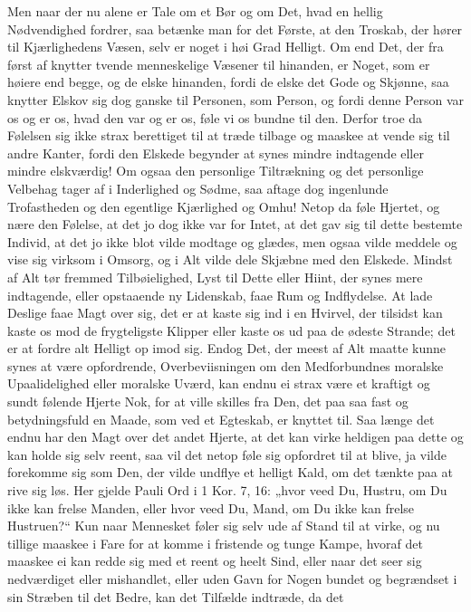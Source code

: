 \documentclass[12pt,a4paper]{book}
\newcommand{\apage}[1]{\marginnote{\footnotesize\textit{[#1]}}}
\begin{document}
Men naar der nu alene er Tale om et Bør og om Det, hvad en hellig
Nødvendighed fordrer, saa betænke man for det Første, at den Troskab, der
hører til Kjærlighedens Væsen, selv er noget i høi Grad Helligt.
Om end Det, der fra først af knytter tvende menneskelige Væsener til
hinanden, er Noget, som er høiere end begge, og de elske hinanden, fordi
de elske det Gode og Skjønne, saa knytter Elskov sig dog ganske til
Personen, som Person, og fordi denne Person var \apage{142} os og er os, hvad den var
og er os, føle vi os bundne til den. Derfor troe da Følelsen sig ikke
strax berettiget til at træde tilbage og maaskee at vende sig til andre
Kanter, fordi den Elskede begynder at synes mindre indtagende eller
mindre elskværdig! Om ogsaa den personlige Tiltrækning og det personlige
Velbehag tager af i Inderlighed og Sødme, saa aftage dog ingenlunde
Trofastheden og den egentlige Kjærlighed og Omhu! Netop da føle Hjertet,
og nære den Følelse, at det jo dog ikke var for Intet, at det gav sig til
dette bestemte Individ, at det jo ikke blot vilde modtage og glædes, men
ogsaa vilde meddele og vise sig virksom i Omsorg, og i Alt vilde dele
Skjæbne med den Elskede. Mindst af Alt tør fremmed Tilbøielighed, Lyst
til Dette eller Hiint, der synes mere indtagende, eller opstaaende ny
Lidenskab, faae Rum og Indflydelse. At lade Deslige faae Magt over sig,
det er at kaste sig ind i en Hvirvel, der tilsidst kan kaste os mod de
frygteligste Klipper eller kaste os ud paa de ødeste Strande; det er at
fordre alt Helligt op imod sig. Endog Det, der meest af Alt maatte kunne
synes at være opfordrende, Overbeviisningen om den Medforbundnes moralske
Upaalidelighed eller moralske Uværd, kan endnu ei strax være et kraftigt
og sundt følende Hjerte Nok, for at ville skilles fra Den, det paa saa
fast og betydningsfuld en Maade, som ved et Egteskab, er knyttet til. Saa
længe det endnu har den Magt over det andet Hjerte, at det kan virke
heldigen paa dette og kan holde sig selv reent, saa vil \apage{143} det netop føle
sig opfordret til at blive, ja vilde forekomme sig som Den, der vilde
undflye et helligt Kald, om det tænkte paa at rive sig løs. Her gjelde
Pauli Ord i 1 Kor. 7, 16: „hvor veed Du, Hustru, om Du ikke kan frelse
Manden, eller hvor veed Du, Mand, om Du ikke kan frelse Hustruen?“ Kun
naar Mennesket føler sig selv ude af Stand til at virke, og nu tillige
maaskee i Fare for at komme i fristende og tunge Kampe, hvoraf det
maaskee ei kan redde sig med et reent og heelt Sind, eller naar det seer
sig nedværdiget eller mishandlet, eller uden Gavn for Nogen bundet og
begrændset i sin Stræben til det Bedre, kan det Tilfælde indtræde, da det
\end{document}
